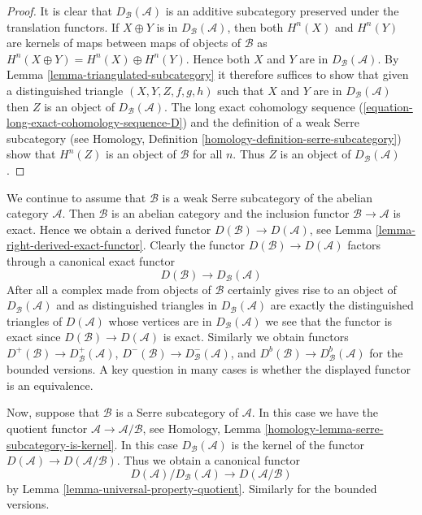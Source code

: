 \begin{proof}
It is clear that $D_\mathcal{B}(\mathcal{A})$ is an additive subcategory
preserved under the translation functors.
If $X \oplus Y$ is in $D_\mathcal{B}(\mathcal{A})$, then
both $H^n(X)$ and $H^n(Y)$ are kernels of maps between maps of objects
of $\mathcal{B}$ as $H^n(X \oplus Y) = H^n(X) \oplus H^n(Y)$.
Hence both $X$ and $Y$ are in $D_\mathcal{B}(\mathcal{A})$. By
Lemma \ref{lemma-triangulated-subcategory}
it therefore suffices to show that given a distinguished triangle
$(X, Y, Z, f, g, h)$ such that $X$ and $Y$ are in $D_\mathcal{B}(\mathcal{A})$
then $Z$ is an object of $D_\mathcal{B}(\mathcal{A})$. The long exact
cohomology sequence (\ref{equation-long-exact-cohomology-sequence-D})
and the definition of a weak Serre subcategory (see
Homology, Definition \ref{homology-definition-serre-subcategory})
show that $H^n(Z)$ is an object of $\mathcal{B}$ for all $n$.
Thus $Z$ is an object of $D_\mathcal{B}(\mathcal{A})$.
\end{proof}

\noindent
We continue to assume that $\mathcal{B}$ is a weak Serre subcategory
of the abelian category $\mathcal{A}$. Then $\mathcal{B}$ is an abelian
category and the inclusion functor $\mathcal{B} \to \mathcal{A}$ is exact.
Hence we obtain a derived functor $D(\mathcal{B}) \to D(\mathcal{A})$, see
Lemma \ref{lemma-right-derived-exact-functor}. Clearly the
functor $D(\mathcal{B}) \to D(\mathcal{A})$ factors through a canonical
exact functor
\begin{equation}
\label{equation-compare}
D(\mathcal{B}) \longrightarrow D_\mathcal{B}(\mathcal{A})
\end{equation}
After all a complex made from objects of $\mathcal{B}$ certainly
gives rise to an object of $D_\mathcal{B}(\mathcal{A})$ and as
distinguished triangles in $D_\mathcal{B}(\mathcal{A})$ are exactly the
distinguished triangles of $D(\mathcal{A})$ whose vertices are in
$D_\mathcal{B}(\mathcal{A})$ we see that the functor is exact since
$D(\mathcal{B}) \to D(\mathcal{A})$ is exact. Similarly we obtain functors
$D^+(\mathcal{B}) \to D^+_\mathcal{B}(\mathcal{A})$,
$D^-(\mathcal{B}) \to D^-_\mathcal{B}(\mathcal{A})$, and
$D^b(\mathcal{B}) \to D^b_\mathcal{B}(\mathcal{A})$
for the bounded versions. A key question in many cases is whether the
displayed functor is an equivalence.

\medskip\noindent
Now, suppose that $\mathcal{B}$ is a Serre subcategory of $\mathcal{A}$.
In this case we have the quotient functor
$\mathcal{A} \to \mathcal{A}/\mathcal{B}$, see
Homology, Lemma \ref{homology-lemma-serre-subcategory-is-kernel}.
In this case $D_\mathcal{B}(\mathcal{A})$ is the kernel of the functor
$D(\mathcal{A}) \to D(\mathcal{A}/\mathcal{B})$.
Thus we obtain a canonical functor
$$
D(\mathcal{A})/D_\mathcal{B}(\mathcal{A})
\longrightarrow
D(\mathcal{A}/\mathcal{B})
$$
by
Lemma \ref{lemma-universal-property-quotient}.
Similarly for the bounded versions.

